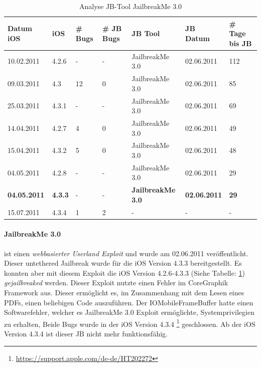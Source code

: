 \begin{table}[hp!]
    \begin{center}
        \begin{tabular}{| p{20mm} | p{12mm} | p{17mm} | p{12mm} | p{32mm} | p{22mm} | p{15mm} |} \hline
             \textbf{Datum iOS} & \textbf{iOS} & \textbf{\# Bugs} & \textbf{\# JB Bugs} & \textbf{JB Tool} & \textbf{JB Datum} & \textbf{\# Tage bis JB} \\ \hline 
            10.02.2011 & 4.2.6 &  - & -  & JailbreakMe 3.0 & 02.06.2011 & 112 \\ \hline
             09.03.2011 & 4.3 & 12 & 0 & JailbreakMe 3.0 &	02.06.2011 & 85 \\ \hline
             25.03.2011 & 4.3.1 &  - & - & JailbreakMe 3.0 & 02.06.2011 & 69 \\ \hline
            14.04.2011 & 4.2.7 &  4 & 0 & JailbreakMe 3.0 & 02.06.2011 & 49 \\ \hline
             15.04.2011 & 4.3.2 & 5 & 0 & JailbreakMe 3.0 & 02.06.2011 & 48 \\ \hline
             04.05.2011 & 4.2.8 &  - & - & JailbreakMe 3.0 & 02.06.2011 & 29 \\ \hline
            \textbf{04.05.2011} & \textbf{4.3.3} &  - & -  & \textbf{JailbreakMe 3.0} & \textbf{02.06.2011} & \textbf{29} \\ \hline
            15.07.2011 & 4.3.4 &  1 & 2	 & - & - & - \\ \hline
        \end{tabular} 
        \caption{Analyse JB-Tool JailbreakMe 3.0 \protect\footnotemark}         
        \label{tab:AnalyseJailbreakMe3.0}
    \end{center}
\end{table}

\paragraph{JailbreakMe 3.0} ist einen \textit{\glqq webbasierter Userland Exploit\grqq{}} und wurde am 02.06.2011 veröffentlicht. Dieser untethered Jailbreak wurde für die iOS Version 4.3.3 bereitgestellt. Es konnten aber mit diesem Exploit die iOS Version 4.2.6-4.3.3 (Siehe Tabelle: \ref{tab:AnalyseJailbreakMe3.0})  \textit{\glqq gejailbreaked\grqq{}} werden. 
Dieser Exploit nutzte einen Fehler im CoreGraphik Framework aus. Dieser ermöglicht es, im Zusammenhang mit dem Lesen eines PDFs, einen beliebigen Code auszuführen. Der IOMobileFrameBuffer hatte einen Softwarefehler, welcher es JailbreakMe 3.0 Exploit ermöglichte, Systemprivilegien zu erhalten, Beide Bugs wurde in der iOS Version 4.3.4 \footnote{\label{foot:iOS4.3.4}{\url{https://support.apple.com/de-de/HT202272}}} geschlossen. Ab der iOS Version 4.3.4 ist dieser JB nicht mehr funktionsfähig.
 
